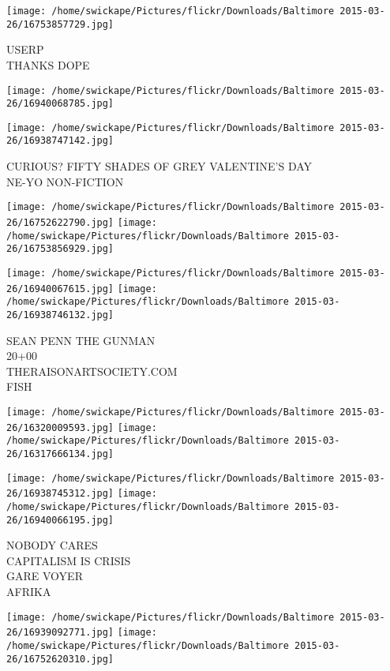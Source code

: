 \documentclass[10pt,letterpaper]{article}
\begin{document}
\vspace{0.25in}
\texttt{[image: /home/swickape/Pictures/flickr/Downloads/Baltimore 2015-03-26/16753857729.jpg]}

USERP\\
THANKS DOPE\\
\pagebreak

\texttt{[image: /home/swickape/Pictures/flickr/Downloads/Baltimore 2015-03-26/16940068785.jpg]}

\vspace{0.25in}
\texttt{[image: /home/swickape/Pictures/flickr/Downloads/Baltimore 2015-03-26/16938747142.jpg]}

CURIOUS?  FIFTY SHADES OF GREY VALENTINE'S DAY\\
NE{-}YO NON{-}FICTION\\
\pagebreak

\texttt{[image: /home/swickape/Pictures/flickr/Downloads/Baltimore 2015-03-26/16752622790.jpg]}
\texttt{[image: /home/swickape/Pictures/flickr/Downloads/Baltimore 2015-03-26/16753856929.jpg]}

\texttt{[image: /home/swickape/Pictures/flickr/Downloads/Baltimore 2015-03-26/16940067615.jpg]}
\texttt{[image: /home/swickape/Pictures/flickr/Downloads/Baltimore 2015-03-26/16938746132.jpg]}

SEAN PENN THE GUNMAN\\
20+00\\
THERAISONARTSOCIETY.COM\\
FISH\\
\pagebreak

\texttt{[image: /home/swickape/Pictures/flickr/Downloads/Baltimore 2015-03-26/16320009593.jpg]}
\texttt{[image: /home/swickape/Pictures/flickr/Downloads/Baltimore 2015-03-26/16317666134.jpg]}

\texttt{[image: /home/swickape/Pictures/flickr/Downloads/Baltimore 2015-03-26/16938745312.jpg]}
\texttt{[image: /home/swickape/Pictures/flickr/Downloads/Baltimore 2015-03-26/16940066195.jpg]}

NOBODY CARES\\
CAPITALISM IS CRISIS\\
GARE VOYER\\
AFRIKA\\
\pagebreak

\texttt{[image: /home/swickape/Pictures/flickr/Downloads/Baltimore 2015-03-26/16939092771.jpg]}
\texttt{[image: /home/swickape/Pictures/flickr/Downloads/Baltimore 2015-03-26/16752620310.jpg]}
\end{document}
